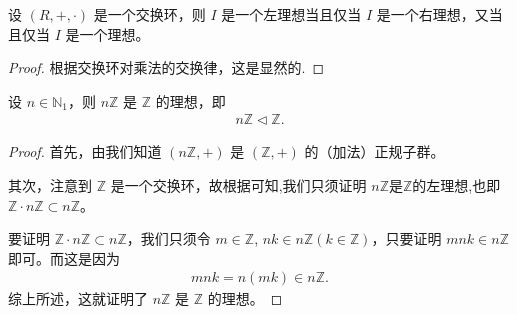 \documentclass[../../main.tex]{subfiles}
\begin{document}
\begin{proposition}\label{proposition:交换环的左理想、右理想、理想等价}
设 $(R, +, \cdot)$ 是一个交换环，则 $I$ 是一个左理想当且仅当 $I$ 是一个右理想，又当且仅当 $I$ 是一个理想。
\end{proposition}
\begin{proof}
根据交换环对乘法的交换律，这是显然的.
\end{proof}

\begin{proposition}\label{proposition:nZ是Z的理想}
设 $n \in \mathbb{N}_1$，则 $n\mathbb{Z}$ 是 $\mathbb{Z}$ 的理想，即
\begin{align*}
n\mathbb{Z} \lhd \mathbb{Z} .
\end{align*}
\end{proposition}
\begin{proof}
首先，由我们知道 $(n\mathbb{Z}, +)$ 是 $(\mathbb{Z}, +)$ 的（加法）正规子群。

其次，注意到 $\mathbb{Z}$ 是一个交换环，故根据可知,我们只须证明 $n\mathbb{Z}$是$\mathbb{Z}$的左理想,也即 $\mathbb{Z} \cdot n\mathbb{Z} \subset n\mathbb{Z}$。

要证明 $\mathbb{Z} \cdot n\mathbb{Z} \subset n\mathbb{Z}$，我们只须令 $m \in \mathbb{Z}$, $nk \in n\mathbb{Z}(k \in \mathbb{Z})$，只要证明 $mnk \in n\mathbb{Z}$ 即可。而这是因为
\begin{align*}
mnk = n(mk) \in n\mathbb{Z} .
\end{align*}
综上所述，这就证明了 $n\mathbb{Z}$ 是 $\mathbb{Z}$ 的理想。 
\end{proof}
\end{document}
